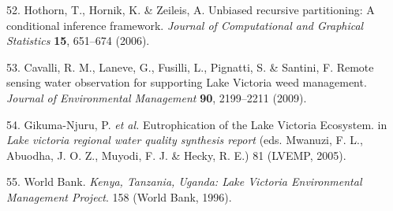 \documentclass[12pt,oneside]{article}
\begin{document}
\leavevmode\hypertarget{ref-Hothorn_et_al_2006}{}%
52. Hothorn, T., Hornik, K. \& Zeileis, A. Unbiased recursive partitioning: A conditional inference framework. \emph{Journal of Computational and Graphical Statistics} \textbf{15}, 651--674 (2006).

\leavevmode\hypertarget{ref-Cavalli_et_al_2009}{}%
53. Cavalli, R. M., Laneve, G., Fusilli, L., Pignatti, S. \& Santini, F. Remote sensing water observation for supporting Lake Victoria weed management. \emph{Journal of Environmental Management} \textbf{90}, 2199--2211 (2009).

\leavevmode\hypertarget{ref-Gikuma-Njuru_et_al_2005}{}%
54. Gikuma-Njuru, P. \emph{et al.} Eutrophication of the Lake Victoria Ecosystem. in \emph{Lake victoria regional water quality synthesis report} (eds. Mwanuzi, F. L., Abuodha, J. O. Z., Muyodi, F. J. \& Hecky, R. E.) 81 (LVEMP, 2005).

\leavevmode\hypertarget{ref-World_Bank_1996}{}%
55. World Bank. \emph{Kenya, Tanzania, Uganda: Lake Victoria Environmental Management Project}. 158 (World Bank, 1996).
\end{document}

